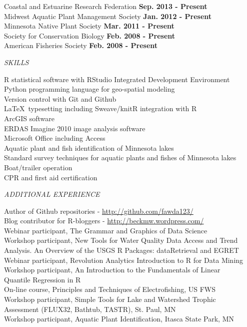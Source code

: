 \documentclass[letterpaper,12pt]{article}
\newcommand{\sectitle}[1]{\vspace{\baselineskip} \centerline{\large{\textit{#1}}}}
\begin{document}
Coastal and Estuarine Research Federation \hfill {\bf Sep. 2013 - Present} \\
Midwest Aquatic Plant Management Society \hfill {\bf Jan. 2012 - Present} \\
Minnesota Native Plant Society \hfill {\bf Mar. 2011 - Present} \\
Society for Conservation Biology \hfill {\bf Feb. 2008 - Present} \\
American Fisheries Society \hfill {\bf Feb. 2008 - Present}

\sectitle{SKILLS}

R statistical software with RStudio Integrated Development Environment \\
Python programming language for geo-spatial modeling \\
Version control with Git and Github \\
\LaTeX\ typesetting including Sweave/knitR integration with R \\
ArcGIS software\\
ERDAS Imagine 2010 image analysis software \\
Microsoft Office including Access \\
Aquatic plant and fish identification of Minnesota lakes \\
Standard survey techniques for aquatic plants and fishes of Minnesota lakes \\
Boat/trailer operation \\
CPR and first aid certification

\sectitle{ADDITIONAL EXPERIENCE}

Author of Github repositories - \url{http://github.com/fawda123/} \\
Blog contributor for R-bloggers - \url{http://beckmw.wordpress.com/} \\
Webinar participant, The Grammar and Graphics of Data Science \\
Workshop participant, New Tools for Water Quality Data Access and Trend \\ \hspace{0.3in} Analysis. An Overview of the USGS R Packages: dataRetrieval and EGRET\\
Webinar participant, Revolution Analytics Introduction to R for Data Mining \\
Workshop participant, An Introduction to the Fundamentals of Linear \\
\hspace{0.3in}Quantile Regression in R \\
On-line course, Principles and Techniques of Electrofishing, US FWS \\
Workshop participant, Simple Tools for Lake and Watershed Trophic \\
\hspace{0.3in}Assessment (FLUX32, Bathtub, TASTR), St. Paul, MN \\
Workshop participant, Aquatic Plant Identification, Itasca State Park, MN 
\end{document}

